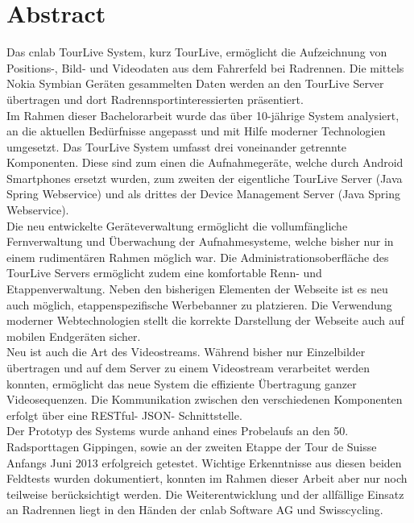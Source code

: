 \chapter*{Abstract}
Das cnlab TourLive System, kurz TourLive, ermöglicht die Aufzeichnung von Positions-, Bild- und Videodaten aus dem Fahrerfeld bei Radrennen. Die mittels Nokia Symbian Geräten gesammelten Daten werden an den TourLive Server übertragen und dort Radrennsportinteressierten präsentiert.
\\

Im Rahmen dieser Bachelorarbeit wurde das über 10-jährige System analysiert, an die aktuellen Bedürfnisse angepasst und mit Hilfe moderner Technologien umgesetzt. Das TourLive System umfasst drei voneinander getrennte Komponenten. Diese sind zum einen die Aufnahmegeräte, welche durch Android Smartphones ersetzt wurden, zum zweiten der eigentliche TourLive Server (Java Spring Webservice) und als drittes der Device Management Server (Java Spring Webservice). 
\\ 

Die neu entwickelte Geräteverwaltung ermöglicht die vollumfängliche Fernverwaltung und Überwachung der Aufnahmesysteme, welche bisher nur in einem rudimentären Rahmen möglich war. Die Administrationsoberfläche des TourLive Servers ermöglicht zudem eine komfortable Renn- und Etappenverwaltung. Neben den bisherigen Elementen der Webseite ist es neu auch möglich, etappenspezifische Werbebanner zu platzieren. Die Verwendung moderner Webtechnologien stellt die korrekte Darstellung der Webseite auch auf mobilen Endgeräten sicher.
\\

Neu ist auch die Art des Videostreams. Während bisher nur Einzelbilder übertragen und auf dem Server zu einem Videostream verarbeitet werden konnten, ermöglicht das neue System die effiziente Übertragung ganzer Videosequenzen. Die Kommunikation zwischen den verschiedenen Komponenten erfolgt über eine RESTful- JSON- Schnittstelle. 
\\

Der Prototyp des Systems wurde anhand eines Probelaufs an den 50. Radsporttagen Gippingen, sowie an der zweiten Etappe der Tour de Suisse Anfangs Juni 2013 erfolgreich getestet. Wichtige Erkenntnisse aus diesen beiden Feldtests wurden dokumentiert, konnten im Rahmen dieser Arbeit aber nur noch teilweise berücksichtigt werden. Die Weiterentwicklung und der allfällige Einsatz an Radrennen liegt in den Händen der cnlab Software AG und Swisscycling.
